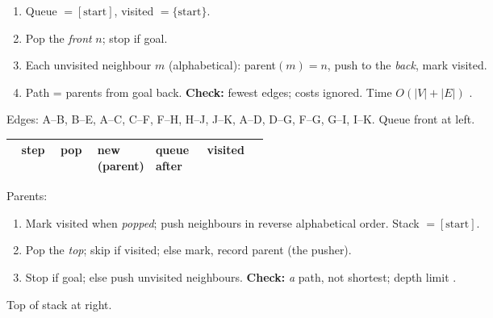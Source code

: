 \begin{multicols}{3}
\label{w12:bfs}
\begin{recipe}[BFS]
\begin{enumerate}
\item Queue $=[\text{start}]$, visited $=\{\text{start}\}$.
\item Pop the \emph{front} $n$; stop if goal.
\item Each unvisited neighbour $m$ (alphabetical): parent$(m)=n$, push to the \emph{back}, mark visited.
\item Path = parents from goal back. \textbf{Check:} fewest edges; costs ignored. Time $O(|V|+|E|)$ .
\end{enumerate}
\end{recipe}
\begin{worked}
Edges: A--B, B--E, A--C, C--F, F--H, H--J, J--K, A--D, D--G, F--G, G--I, I--K. Queue front at left.\par\vspace{1pt}
\scriptsize\setlength{\tabcolsep}{2pt}
\begin{tabularx}{\linewidth}{@{}rc>{\raggedright\arraybackslash}p{0.17\linewidth}>{\raggedright\arraybackslash}p{0.2\linewidth}X@{}}\toprule
step & pop & new (parent) & queue after & visited\\\midrule
\bottomrule\end{tabularx}\par\vspace{1pt}
Parents: %
\end{worked}
\begin{recipe}
\begin{enumerate}
\item Mark visited when \emph{popped}; push neighbours in reverse alphabetical order. Stack $=[\text{start}]$.
\item Pop the \emph{top}; skip if visited; else mark, record parent (the pusher).
\item Stop if goal; else push unvisited neighbours. \textbf{Check:} \emph{a} path, not shortest; depth limit .
\end{enumerate}
\end{recipe}
\begin{worked}
Top of stack at right.\par\vspace{1pt}
\scriptsize\setlength{\tabcolsep}{2.5pt}

\end{worked}
\end{multicols}
